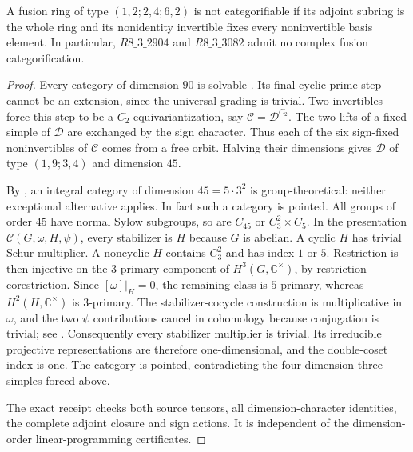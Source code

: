 \begin{theorem}\label{thm:m3-dimension90}
A fusion ring of type $(1,2;2,4;6,2)$ is not categorifiable if its adjoint
subring is the whole ring and its nonidentity invertible fixes every
noninvertible basis element. In particular, $R8\_3\_2904$ and
$R8\_3\_3082$ admit no complex fusion categorification.
\end{theorem}
\begin{proof}
Every category of dimension $90$ is solvable
\cite[Corollary~4.16]{DongWeak}. Its final cyclic-prime step
\cite[Proposition~4.4]{ENOSolvable} cannot be an extension, since the
universal grading is trivial. Two invertibles force this step to be a
$C_2$ equivariantization, say $\mathcal C=\mathcal D^{C_2}$.
The two lifts of a fixed simple of $\mathcal D$ are exchanged by the
sign character. Thus each of the six sign-fixed noninvertibles of
$\mathcal C$ comes from a free orbit. Halving their dimensions gives
$\mathcal D$ of type $(1,9;3,4)$ and dimension $45$.

By \cite[Theorem~1.1]{JordanLarson}, an integral category of dimension
$45=5\cdot3^2$ is group-theoretical: neither exceptional alternative
applies. In fact such a category is pointed. All groups of order $45$
have normal Sylow subgroups, so are $C_{45}$ or $C_3^2\times C_5$.
In the presentation $\mathcal C(G,\omega,H,\psi)$, every stabilizer
is $H$ because $G$ is abelian. A cyclic $H$ has trivial Schur multiplier.
A noncyclic $H$ contains $C_3^2$ and has index $1$ or $5$. Restriction is then
injective on the $3$-primary component of $H^3(G,\mathbb C^\times)$,
by restriction--corestriction. Since $[\omega]|_H=0$, the remaining
class is $5$-primary, whereas $H^2(H,\mathbb C^\times)$ is $3$-primary.
The stabilizer-cocycle construction is multiplicative in $\omega$,
and the two $\psi$ contributions cancel in cohomology because
conjugation is trivial; see \cite[Section~5.1]{GelakiNaidu}.
Consequently every stabilizer multiplier is trivial. Its irreducible
projective representations are therefore one-dimensional, and the
double-coset index is one. The category is pointed, contradicting
the four dimension-three simples forced above.

The exact receipt checks both source tensors, all dimension-character
identities, the complete adjoint closure and sign actions. It is
independent of the dimension-order linear-programming certificates.
\end{proof}
